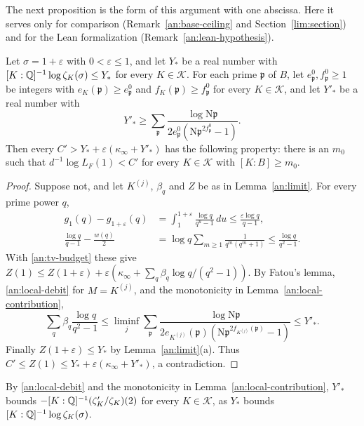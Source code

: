 The next proposition is the form of this argument with one abscissa. Here
it serves only for comparison (Remark~\ref{an:base-ceiling} and
Section~\ref{lim:section}) and for the Lean formalization
(Remark~\ref{an:lean-hypothesis}).

\begin{proposition}\label{an:prime-budget}
Let $\sigma=1+\varepsilon$ with $0<\varepsilon\le1$, and let $Y_*$ be a real
number with $[K:\mathbb Q]^{-1}\log\zeta_K(\sigma)\le Y_*$ for every
$K\in\mathcal K$. For each prime $\mathfrak p$ of $B$, let
$e^0_{\mathfrak p},f^0_{\mathfrak p}\ge1$ be integers with
$e_K(\mathfrak p)\ge e^0_{\mathfrak p}$ and $f_K(\mathfrak p)\ge
f^0_{\mathfrak p}$ for every $K\in\mathcal K$, and let $Y'_*$ be a real
number with
\[
 Y'_*\ge\sum_{\mathfrak p}\frac{\log\mathrm N\mathfrak p}
 {2e^0_{\mathfrak p}(\mathrm N\mathfrak p^{2f^0_{\mathfrak p}}-1)}.
\]
Then every $C'>Y_*+\varepsilon(\kappa_\infty+Y'_*)$ has the following
property: there is an $m_0$ such that $d^{-1}\log L_F(1)<C'$ for every
$K\in\mathcal K$ with $[K:B]\ge m_0$.
\end{proposition}

\begin{proof}
Suppose not, and let $K^{(j)}$, $\beta_q$ and $Z$ be as in
Lemma~\ref{an:limit}. For every prime power $q$,
\begin{align*}
 g_1(q)-g_{1+\varepsilon}(q)&=\int_1^{1+\varepsilon}\frac{\log q}{q^u-1}\,du
 \le\frac{\varepsilon\log q}{q-1},\\
 \frac{\log q}{q-1}-\frac{w(q)}2&=\log q\sum_{m\ge1}\frac1{q^m(q^m+1)}
 \le\frac{\log q}{q^2-1}.
\end{align*}
With \eqref{an:tv-budget} these give
$Z(1)\le Z(1+\varepsilon)+\varepsilon(\kappa_\infty+\sum_q\beta_q\log q/(q^2-1))$.
By Fatou's lemma, \eqref{an:local-debit} for $M=K^{(j)}$, and the monotonicity
in Lemma~\ref{an:local-contribution},
\[
 \sum_q\beta_q\frac{\log q}{q^2-1}
 \le\liminf_j\sum_{\mathfrak p}\frac{\log\mathrm N\mathfrak p}
 {2e_{K^{(j)}}(\mathfrak p)(\mathrm N\mathfrak p^{2f_{K^{(j)}}(\mathfrak p)}-1)}
 \le Y'_*.
\]
Finally $Z(1+\varepsilon)\le Y_*$ by Lemma~\ref{an:limit}(a). Thus
$C'\le Z(1)\le Y_*+\varepsilon(\kappa_\infty+Y'_*)$, a contradiction.
\end{proof}

By \eqref{an:local-debit} and the monotonicity in
Lemma~\ref{an:local-contribution}, $Y'_*$ bounds
$-[K:\mathbb Q]^{-1}(\zeta_K'/\zeta_K)(2)$ for every $K\in\mathcal K$, as $Y_*$
bounds $[K:\mathbb Q]^{-1}\log\zeta_K(\sigma)$.


